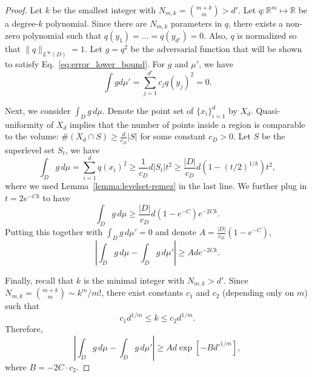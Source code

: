 \documentclass{article}
\theoremstyle{plain}
\newenvironment{REV*}
  {\begingroup\color[HTML]{000000}}
  {\endgroup}
\begin{document}
\begin{REV*}
\begin{proof}
    Let $k$ be the smallest integer with $N_{m,k} = \binom{m+k}{m} > d'$. Let $q: \mathbb{R}^m\mapsto \mathbb{R}$ be a degree-$k$ polynomial. Since there are $N_{m,k}$ parameters in $q$, there exists a non-zero polynomial such that $q(y_1) = \dots = q(y_{d'}) = 0$. Also, $q$ is normalized so that $\|q\|_{L^\infty(D)} = 1$. Let $g=q^2$ be the adversarial function that will be shown to satisfy Eq.~\eqref{eq:error_lower_bound}. For $g$ and $\mu'$, we have
    \begin{equation}
        \int g d\mu' = \sum_{j=1}^{d'} c_j q(y_j)^2 = 0 .
    \end{equation}

    Next, we consider $\int_D g\,d\mu$. Denote the point set of $\{x_i\}_{i=1}^d$ by $X_d$. Quasi-uniformity of $X_d$ implies that the number of points inside a region is comparable to the volume: $\# (X_d \cap S) \geq \frac{d}{c_D} |S|$ for some constant $c_D>0$. Let $S$ be the superlevel set $S_t$, we have
    \begin{equation}
        \int_D g\, d\mu = \sum_{i=1}^{d} q(x_i)^2
        \geq \frac{1}{c_D} d |S_t| t^2
        \geq \frac{|D|}{c_D} d \left( 1- (t/2)^{1/k} \right) t^2    ,
    \end{equation}
    where we used Lemma~\ref{lemma:levelset-remez} in the last line. We further plug in $t=2e^{-Ck}$ to have
    \begin{equation}
        \int_D g\, d\mu
        \geq \frac{|D|}{c_D} d \left( 1- e^{-C} \right) e^{-2Ck}    .
    \end{equation}
    Putting this together with $\int_D g\, d\mu'=0$ and denote $A = \frac{|D|}{c_D} \left( 1- e^{-C} \right)$, 
    \begin{equation}
        \left| \int_D g\, d\mu - \int_D g\, d\mu' \right| \geq A d e^{-2Ck}. 
    \end{equation}

    Finally, recall that $k$ is the minimal integer with $N_{m,k}>d'$. Since $N_{m,k} = \binom{m+k}{m}\sim k^m/m!$, there exist constants $c_1$ and $c_2$ (depending only on $m$) such that
    \begin{equation}
        c_1 d^{1/m} \leq k \leq c_2 d^{1/m}.
    \end{equation}
    Therefore,
    \begin{equation}
        \left| \int_D g\, d\mu - \int_D g\, d\mu' \right| \geq A d \exp [-B d'^{1/m}]   ,
    \end{equation}
    where $B = -2C\cdot c_2$. 
\end{proof}


\end{REV*}
\end{document}
